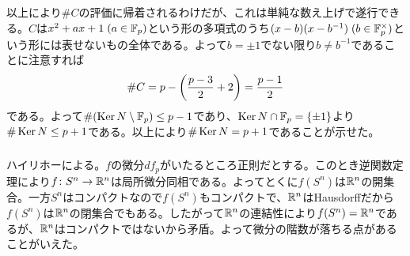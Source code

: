 \begin{sol}
\begin{description}
    以上により$\# C$の評価に帰着されるわけだが、これは単純な数え上げで遂行できる。$C$は$x^2 + ax + 1 \; ( a \in {\mathbb F}_p)$という形の多項式のうち$(x - b)(x - b^{-1}) \; ( b \in {\mathbb F}_p^{\times})$という形には表せないもの全体である。よって$b= \pm 1$でない限り$b \neq b^{-1}$であることに注意すれば
    \[
    \# C = p - \left( \frac{p-3}{2} + 2 \right) = \frac{p-1}{2}
    \]
    である。よって$\# ( \operatorname{Ker} N \setminus {\mathbb F}_p) \leq p-1$であり、$\operatorname{Ker} N \cap {\mathbb F}_p = \{ \pm 1 \}$より$\# \operatorname{Ker} N \leq p+1$である。以上により$\# \operatorname{Ker} N = p+1$であることが示せた。
  \end{description}
\end{sol}

\newpage


\subsubsection{}%
\begin{sol}
  ハイリホーによる。$f$の微分$df_p$がいたるところ正則だとする。このとき逆関数定理により$f \colon S^n \to {\mathbb R}^n$は局所微分同相である。よってとくに$f(S^n)$は${\mathbb R}^n$の開集合。一方$S^n$はコンパクトなので$f(S^n)$もコンパクトで、${\mathbb R}^n$はHausdorffだから$f(S^n)$は${\mathbb R}^n$の閉集合でもある。したがって${\mathbb R}^n$の連結性により$f(S^n) = {\mathbb R}^n$であるが、${\mathbb R}^n$はコンパクトではないから矛盾。よって微分の階数が落ちる点があることがいえた。
\end{sol}

\newpage


